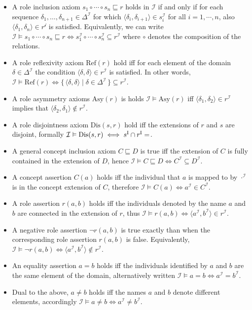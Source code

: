 \begin{itemize}
    \item A role inclusion axiom $s_1 \circ \cdots \circ s_n \sqsubseteq r$ holds in $\mathcal{I}$ if and only if for each sequence $\delta_1, \dots, \delta_{n + 1} \in \Delta^\mathcal{I}$ for which $\langle \delta_i , \delta_{i + 1} \rangle \in s_i^\mathcal{I}$ for all $i = 1, \cdots, n$, also $\langle \delta_1 , \delta_n \rangle \in r^\mathcal{i}$ is satisfied. Equivalently, we can write $\mathcal{I} \vDash s_1 \circ \cdots \circ s_n \sqsubseteq r \iff s_1^\mathcal{I} \circ \cdots \circ s_n^\mathcal{I} \subseteq r^\mathcal{I}$ where $\circ$ denotes the composition of the relations.
    \item A role reflexivity axiom $\mathrm{Ref}(r)$ hold iff for each element of the domain $\delta \in \Delta^\mathcal{I}$ the condition $\langle \delta , \delta \rangle \in r^\mathcal{I}$ is satisfied. In other words, $\mathcal{I} \vDash \mathrm{Ref}(r) \iff \{ \, \langle \delta, \delta \rangle \mid \delta \in \Delta^\mathcal{I} \, \} \subseteq r^\mathcal{I}$.
    \item A role asymmetry axioms $\mathrm{Asy}(r)$ is holds $\mathcal{I} \vDash \mathrm{Asy}(r)$ iff $\langle \delta_1 , \delta_2 \rangle \in r^\mathcal{I}$ implies that $\langle \delta_2, \delta_1 \rangle \not\in r^\mathcal{I}$.
    \item A role disjointness axiom $\mathrm{Dis}(s, r)$ hold iff the extensions of $r$ and $s$ are disjoint, formally $\mathcal{I} \vDash \mathrm{Dis}(s, r) \iff s^\mathrm{I} \cap r^\mathrm{I} = \empty$.
    \item A general concept inclusion axiom $C \sqsubseteq D$ is true iff the extension of $C$ is fully contained in the extension of $D$, hence $\mathcal{I} \vDash C \sqsubseteq D \iff C^\mathcal{I} \subseteq D^\mathcal{I}$.
    \item A concept assertion $C(a)$ holds iff the individual that $a$ is mapped to by $\cdot^\mathcal{I}$ is in the concept extension of $C$, therefore $\mathcal{I} \vDash C (a) \iff a^\mathcal{I} \in C^\mathcal{I}$.
    \item A role assertion $r(a, b)$ holds iff the individuals denoted by the name $a$ and $b$ are connected in the extension of $r$, thus $\mathcal{I} \vDash r (a, b) \iff \langle a^\mathcal{I}, b^\mathcal{I} \rangle \in r^\mathcal{I}$.
    \item A negative role assertion $\lnot r (a, b)$ is true exactly than when the corresponding role assertion $r (a, b)$ is false. Equivalently,  $\mathcal{I} \vDash \lnot r (a, b) \iff \langle a^\mathcal{I}, b^\mathcal{I} \rangle \not\in r^\mathcal{I}$.
    \item An equality assertion $a = b$ holds iff the individuals identified by $a$ and $b$ are the same element of the domain, alternatively written $\mathcal{I} \vDash a = b \iff a^\mathcal{I} = b^\mathcal{I}$.
    \item Dual to the above, $a \not = b$ holds iff the names $a$ and $b$ denote different elements, accordingly $\mathcal{I} \vDash a \not= b \iff a^\mathcal{I} \not= b^\mathcal{I}$.
\end{itemize}

